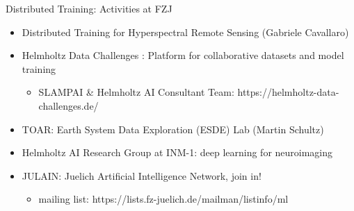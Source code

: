 \begin{frame}{Distributed Training: Activities at FZJ}
\protect\hypertarget{distributed-training-activities-at-fzj}{}
\begin{itemize}
\tightlist
\item
  Distributed Training for Hyperspectral Remote Sensing (Gabriele
  Cavallaro)
\item
  Helmholtz Data Challenges : Platform for collaborative datasets and
  model training

  \begin{itemize}
  \tightlist
  \item
    SLAMPAI \& Helmholtz AI Consultant Team:
    https://helmholtz-data-challenges.de/
  \end{itemize}
\item
  TOAR: Earth System Data Exploration (ESDE) Lab (Martin Schultz)
\item
  Helmholtz AI Research Group at INM-1: deep learning for neuroimaging
\item
  JULAIN: Juelich Artificial Intelligence Network, join in!

  \begin{itemize}
  \tightlist
  \item
    mailing list: https://lists.fz-juelich.de/mailman/listinfo/ml
  \end{itemize}
\end{itemize}

\end{frame}

